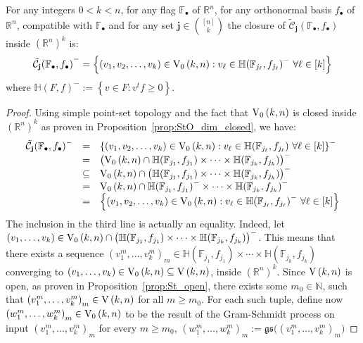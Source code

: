 \begin{lemma}\label{lem:closure_of_cells} For any integers $0<k<n$, for any flag $\mathbb{F}_{\bullet}$ of $\mathbb{R}^n$, for any orthonormal basis $f_{\bullet}$ of $\mathbb{R}^n$, compatible with $\mathbb{F}_{\bullet}$ and for any set $\mathbf{j}\in\binom{[n]}{k}$ the closure of $\tilde{\mathcal{C}}_{\mathbf{j}}{\left(\mathbb{F}_{\bullet},f_{\bullet}\right)}$ inside ${\left(\mathbb{R}^n\right)}^k$ is:
\[{\tilde{\mathcal{C}}_{\mathbf{j}}{\left(\mathbb{F}_{\bullet},f_{\bullet}\right)}}^-=\left\{(v_1,v_2,\ldots,v_k)\in\StO{k}{n}:v_{\ell}\in{\mathbb{H}(\mathbb{F}_{j_{\ell}},f_{j_{\ell}})}^-\ \forall\ell\in[k]\right\}\]
where
${\mathbb{H}(F,f)}^-:=\left\{v\in F:v^tf\geq 0\right\}$.
\end{lemma}
\begin{proof} Using simple point-set topology and the fact that $\StO{k}{n}$ is closed inside ${\left(\mathbb{R}^n\right)}^k$ as proven in Proposition~\ref{prop:StO_dim_closed}, we have:
\[\begin{array}{rcl}\tilde{\mathcal{C}}_{\mathbf{j}}{\left(\mathbb{F}_{\bullet},f_{\bullet}\right)}^-
&=&{\left\{(v_1,v_2,\ldots,v_k)\in\StO{k}{n}:v_{\ell}\in\mathbb{H}(\mathbb{F}_{j_{\ell}},f_{j_{\ell}})\ \forall\ell\in[k]\right\}}^-\\
&=&{\big(\StO{k}{n}\cap\mathbb{H}(\mathbb{F}_{j_1},f_{j_1})\times\cdots\times\mathbb{H}(\mathbb{F}_{j_k},f_{j_k})\big)}^-\\
&\subseteq&\StO{k}{n}\cap{\big(\mathbb{H}(\mathbb{F}_{j_1},f_{j_1})\times\cdots\times\mathbb{H}(\mathbb{F}_{j_k},f_{j_k})\big)}^-\\
&=&\StO{k}{n}\cap\mathbb{H}{\left(\mathbb{F}_{j_1},f_{j_1}\right)}^-\times\cdots\times\mathbb{H}{\left(\mathbb{F}_{j_k},f_{j_k}\right)}^-\\
&=&\left\{(v_1,v_2,\ldots,v_k)\in\StO{k}{n}:v_{\ell}\in{\mathbb{H}(\mathbb{F}_{j_{\ell}},f_{j_{\ell}})}^-\ \forall\ell\in[k]\right\}\\
\end{array}\]
The inclusion in the third line is actually an equality. Indeed, let $(v_1,\ldots,v_k)\in\StO{k}{n}\cap{\big(\mathbb{H}(\mathbb{F}_{j_1},f_{j_1})\times\cdots\times\mathbb{H}(\mathbb{F}_{j_k},f_{j_k})\big)}^-$. This means that there exists a sequence ${(v_1^m,\ldots,v_k^m)}_m\in\mathbb{H}(\mathbb{F}_{j_1},f_{j_1})\times\cdots\times\mathbb{H}(\mathbb{F}_{j_k},f_{j_k})$ converging to $(v_1,\ldots,v_k)\in\StO{k}{n}\subseteq\St{k}{n}$, inside ${\left(\mathbb{R}^n\right)}^k$. Since $\St{k}{n}$ is open, as proven in Proposition~\ref{prop:St_open}, there exists some $m_0\in\mathbb{N}$, such that ${(v_1^m,\ldots,v_k^m)}_m\in\St{k}{n}$ for all $m\geq m_0$. For each such tuple, define now ${(w_1^m,\ldots,w_k^m)}_m\in\StO{k}{n}$ to be the result of the Gram-Schmidt process on input ${(v_1^m,\ldots,v_k^m)}_m$ for every $m\geq m_0$,
${(w_1^m,\ldots,w_k^m)}_m:=\mathfrak{gs}\big({(v_1^m,\ldots,v_k^m)}_m\big)$


\end{proof}
